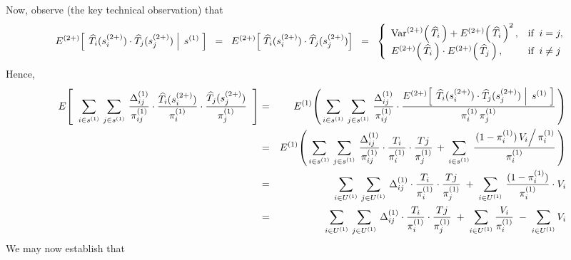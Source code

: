 Now, observe {\color{red}(the key technical observation)} that
\begin{equation*}
E^{(2+)}\!\left[\;\left.\widehat{T}_{i}(s^{(2+)}_{i})\cdot\widehat{T}_{j}(s^{(2+)}_{j})\;\right\vert\;s^{(1)}\;\right]
\;\;=\;\;
E^{(2+)}\!\left[\;\widehat{T}_{i}(s^{(2+)}_{i})\cdot\widehat{T}_{j}(s^{(2+)}_{j})\right]
\;\;=\;\;
\left\{
\begin{array}{ll}
\textnormal{Var}^{(2+)}\!\left(\,\widehat{T}_{i}\,\right) + E^{(2+)}\!\left(\,\widehat{T}_{i}\,\right)^{2}, & \textnormal{if}\;\; i = j, \\
E^{(2+)}\!\left(\,\widehat{T}_{i}\,\right)\cdot E^{(2+)}\!\left(\,\widehat{T}_{j}\,\right)      , & \textnormal{if}\;\; i \neq j
\end{array}
\right.
\end{equation*}
Hence,
\begin{eqnarray*}
E\!\left[\;\;
\sum_{i\in s^{(1)}}\,\sum_{j\in s^{(1)}}\,
\dfrac{\Delta^{(1)}_{ij}}{\pi^{(1)}_{ij}}
\cdot
\dfrac{\widehat{T}_{i}(s^{(2+)}_{i})}{\pi^{(1)}_{i}}
\cdot
\dfrac{\widehat{T}_{j}(s^{(2+)}_{j})}{\pi^{(1)}_{j}}
\;\;\right]
&=&
E^{(1)}\!\left(\,
\sum_{i\in s^{(1)}}\,\sum_{j\in s^{(1)}}\,
\dfrac{\Delta^{(1)}_{ij}}{\pi^{(1)}_{ij}}
\cdot
\dfrac{E^{(2+)}\!\left[\;\left.\widehat{T}_{i}(s^{(2+)}_{i})\cdot\widehat{T}_{j}(s^{(2+)}_{j})\;\right\vert\;s^{(1)}\;\right]}{\pi^{(1)}_{i}\,\pi^{(1)}_{j}}
\,\right)
\\
&=&
E^{(1)}\!\left(\,
\sum_{i\in s^{(1)}}\,\sum_{j\in s^{(1)}}\,
\dfrac{\Delta^{(1)}_{ij}}{\pi^{(1)}_{ij}}
\cdot
\dfrac{T_{i}}{\pi^{(1)}_{i}}\cdot\dfrac{T{j}}{\pi^{(1)}_{j}}
\,+\,
\sum_{i\in s^{(1)}}\,
\dfrac{\left.(1-\pi^{(1)}_{i})\,V_{i}\right/\pi^{(1)}_{i}}{\pi^{(1)}_{i}}
\,\right)
\\
&=&
\sum_{i \in U^{(1)}}\,\sum_{j \in U^{(1)}}\,
\Delta^{(1)}_{ij} \cdot \dfrac{T_{i}}{\pi^{(1)}_{i}} \cdot \dfrac{T{j}}{\pi^{(1)}_{j}}
\;+\;
\sum_{i \in U^{(1)}} \, \dfrac{(1-\pi^{(1)}_{i})}{\pi^{(1)}_{i}}\cdot V_{i}
\\
&=&
\sum_{i \in U^{(1)}}\,\sum_{j \in U^{(1)}}\,
\Delta^{(1)}_{ij} \cdot \dfrac{T_{i}}{\pi^{(1)}_{i}} \cdot \dfrac{T{j}}{\pi^{(1)}_{j}}
\;+\;
\sum_{i \in U^{(1)}} \dfrac{V_{i}}{\pi^{(1)}_{i}}
\;-\;
\sum_{i \in U^{(1)}} V_{i}
\end{eqnarray*}
We may now establish that
